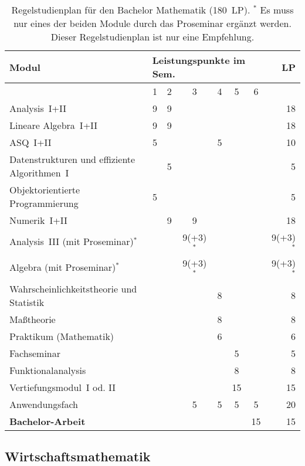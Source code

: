 \begin{table}[tbp]
    \begin{small}
    \begin{tabularx}{\textwidth}{|X||c|c|c|c|c|c||r|}
        \hline
        \textbf{Modul}&\multicolumn{6}{l||}{\textbf{Leistungspunkte im Sem.}}&\textbf{LP}\\\hline
        &1&2&3&4&5&6&\\\hline\hline
        Analysis~I+II&9&9&&&&&18\\\hline
        Lineare Algebra~I+II&9&9&&&&&18\\\hline
        ASQ~I+II&5&&&5&&&10\\\hline
        Datenstrukturen und \newline effiziente Algorithmen~I&&5&&&&&5\\\hline
        Objektorientierte Programmierung&5&&&&&&5\\\hline
        Numerik~I+II&&9&9&&&&18\\\hline
        Analysis~III (mit Proseminar)$^{*}$&&&9(+3)$^{*}$&&&&9(+3)$^{*}$\\\hline
        Algebra (mit Proseminar)$^{*}$&&&9(+3)$^{*}$&&&&9(+3)$ ^{*}$\\\hline
        Wahrscheinlichkeitstheorie und Statistik&&&&8&&&8\\\hline
        Maßtheorie&&&&8&&&8\\\hline
        Praktikum (Mathematik)&&&&6&&&6\\\hline
        Fachseminar&&&&&5&&5\\\hline
        Funktionalanalysis&&&&&8&&8\\\hline
        Vertiefungsmodul~I od. II&&&&&15&&15 \\\hline
        Anwendungsfach&&&5&5&5&5&20\\\hline\hline
        \textbf{Bachelor-Arbeit}&&&&&&15&15\\\hline\hline
    \end{tabularx}
    \end{small}
    \caption{\label{plan-mathe}Regelstudienplan für den Bachelor Mathematik (180~LP).\newline
     $^{*}$ Es muss nur eines der beiden Module durch das Proseminar ergänzt werden.   
     Dieser Regelstudienplan ist nur eine Empfehlung.}
\end{table}


\newpage
\subsection{Wirtschaftsmathematik}
\label{studiengang_wima}

